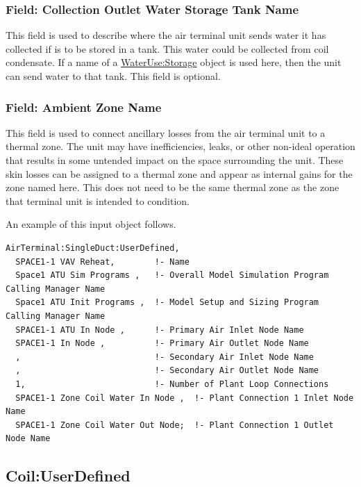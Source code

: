 \subsubsection{Field: Collection Outlet Water Storage Tank Name}\label{field-collection-outlet-water-storage-tank-name-1}

This field is used to describe where the air terminal unit sends water it has collected if is to be stored in a tank. This water could be collected from coil condensate. If a name of a \hyperref[waterusestorage]{WaterUse:Storage} object is used here, then the unit can send water to that tank. This field is optional.

\subsubsection{Field: Ambient Zone Name}\label{field-ambient-zone-name-1}

This field is used to connect ancillary losses from the air terminal unit to a thermal zone. The unit may have inefficiencies, leaks, or other non-ideal operation that results in some untended impact on the space surrounding the unit. These skin losses can be assigned to a thermal zone and appear as internal gains for the zone named here. This does not need to be the same thermal zone as the zone that terminal unit is intended to condition.

An example of this input object follows.

\begin{lstlisting}
AirTerminal:SingleDuct:UserDefined,
  SPACE1-1 VAV Reheat,        !- Name
  Space1 ATU Sim Programs ,   !- Overall Model Simulation Program Calling Manager Name
  Space1 ATU Init Programs ,  !- Model Setup and Sizing Program Calling Manager Name
  SPACE1-1 ATU In Node ,      !- Primary Air Inlet Node Name
  SPACE1-1 In Node ,          !- Primary Air Outlet Node Name
  ,                           !- Secondary Air Inlet Node Name
  ,                           !- Secondary Air Outlet Node Name
  1,                          !- Number of Plant Loop Connections
  SPACE1-1 Zone Coil Water In Node ,  !- Plant Connection 1 Inlet Node Name
  SPACE1-1 Zone Coil Water Out Node;  !- Plant Connection 1 Outlet Node Name
\end{lstlisting}

\subsection{Coil:UserDefined}\label{coiluserdefined}

